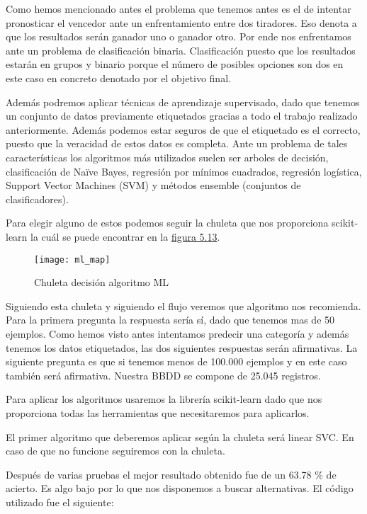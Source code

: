 Como hemos mencionado antes el problema que tenemos antes es el de intentar pronosticar
el vencedor ante un enfrentamiento entre dos tiradores. Eso denota a que los resultados
serán ganador uno o ganador otro. Por ende nos enfrentamos ante un problema de clasificación
binaria. Clasificación puesto que los resultados estarán en grupos y binario porque el número
de posibles opciones son dos en este caso en concreto denotado por el objetivo final.

Además podremos aplicar técnicas de aprendizaje supervisado, dado que tenemos un conjunto de datos
previamente etiquetados gracias a todo el trabajo realizado anteriormente. Además podemos
estar seguros de que el etiquetado es el correcto, puesto que la veracidad de estos datos
es completa. Ante un problema de tales características los algoritmos más utilizados suelen ser
arboles de decisión, clasificación de Naïve Bayes, regresión por mínimos cuadrados, regresión
logística, Support Vector Machines (SVM) y métodos ensemble (conjuntos de clasificadores).

Para elegir alguno de estos podemos seguir la chuleta que nos proporciona scikit-learn la cuál se
puede encontrar en la \hyperref[fig:Chuleta decisión algoritmo ML]{figura 5.13}.

\begin{figure}[htb]
  \centering
    \texttt{[image: ml\_map]}
  \caption[Chuleta decisión algoritmo ML]{Chuleta decisión algoritmo ML}
  \label{fig:Chuleta decisión algoritmo ML}
\end{figure}

Siguiendo esta chuleta y siguiendo el flujo veremos que algoritmo nos recomienda.
Para la primera pregunta la respuesta sería sí, dado que tenemos mas de 50 ejemplos.
Como hemos visto antes intentamos predecir una categoría y además tenemos los datos
etiquetados, las dos siguientes respuestas serán afirmativas. La siguiente pregunta
es que si tenemos menos de 100.000 ejemplos y en este caso también será afirmativa.
Nuestra BBDD se compone de 25.045 registros.

Para aplicar los algoritmos usaremos la librería scikit-learn dado que nos proporciona
todas las herramientas que necesitaremos para aplicarlos.

El primer algoritmo que deberemos aplicar según la chuleta será linear SVC. En caso
de que no funcione seguiremos con la chuleta.

Después de varias pruebas el mejor resultado obtenido fue de un 63.78 \% de acierto. Es
algo bajo por lo que nos disponemos a buscar alternativas. El código utilizado fue el siguiente:

